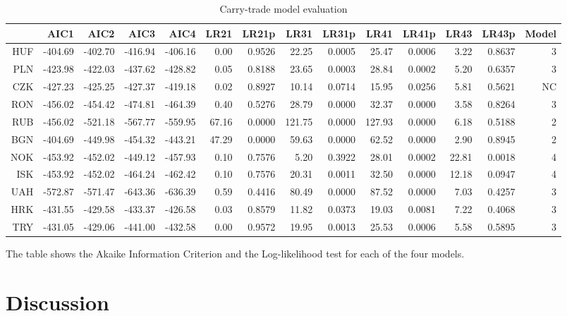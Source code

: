 \documentclass[preprint,12pt,authoryear]{elsarticle}
\begin{document}
\begin{landscape}
\begin{table}[ht]
\begin{threeparttable}
\centering
\begin{tabular}{rrrrrrrrrrrrrr}
  \hline
 & AIC1 & AIC2 & AIC3 & AIC4 & LR21 & LR21p & LR31 & LR31p & LR41 & LR41p & LR43 & LR43p& Model \\ 
  \hline
HUF & -404.69 & -402.70 & -416.94 & -406.16 & 0.00 & 0.9526 & 22.25 & 0.0005 & 25.47 & 0.0006 & 3.22 & 0.8637 & 3\\ 
  PLN & -423.98 & -422.03 & -437.62 & -428.82 & 0.05 & 0.8188 & 23.65 & 0.0003 & 28.84 & 0.0002 & 5.20 & 0.6357 &3\\ 
  CZK & -427.23 & -425.25 & -427.37 & -419.18 & 0.02 & 0.8927 & 10.14 & 0.0714 & 15.95 & 0.0256 & 5.81 & 0.5621 &NC \\ 
  RON & -456.02 & -454.42 & -474.81 & -464.39 & 0.40 & 0.5276 & 28.79 & 0.0000 & 32.37 & 0.0000 & 3.58 & 0.8264 & 3\\ 
  RUB & -456.02 & -521.18 & -567.77 & -559.95 & 67.16 & 0.0000 & 121.75 & 0.0000 & 127.93 & 0.0000 & 6.18 & 0.5188 & 2\\ 
  BGN & -404.69 & -449.98 & -454.32 & -443.21 & 47.29 & 0.0000 & 59.63 & 0.0000 & 62.52 & 0.0000 & 2.90 & 0.8945 & 2\\ 
  NOK & -453.92 & -452.02 & -449.12 & -457.93 & 0.10 & 0.7576 & 5.20 & 0.3922 & 28.01 & 0.0002 & 22.81 & 0.0018 &4 \\ 
  ISK & -453.92 & -452.02 & -464.24 & -462.42 & 0.10 & 0.7576 & 20.31 & 0.0011 & 32.50 & 0.0000 & 12.18 & 0.0947 &  4\\ 
  UAH & -572.87 & -571.47 & -643.36 & -636.39 & 0.59 & 0.4416 & 80.49 & 0.0000 & 87.52 & 0.0000 & 7.03 & 0.4257 &3\\ 
  HRK & -431.55 & -429.58 & -433.37 & -426.58 & 0.03 & 0.8579 & 11.82 & 0.0373 & 19.03 & 0.0081 & 7.22 & 0.4068 &3\\ 
  TRY & -431.05 & -429.06 & -441.00 & -432.58 & 0.00 & 0.9572 & 19.95 & 0.0013 & 25.53 & 0.0006 & 5.58 & 0.5895 &3\\ 
   \hline
\end{tabular}
\begin{tablenotes}
\small
\item The table shows the Akaike Information Criterion and the Log-likelihood test for each of the four models.  
\end{tablenotes}
\end{threeparttable}
\caption{Carry-trade model evaluation} 
\label{tabref:ctme}
\end{table}
\end{landscape}


\section*{Discussion}

\end{document}
